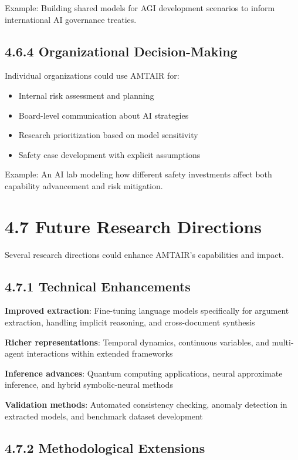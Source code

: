 \documentclass[
  11pt,
  letterpaper,
]{book}
\providecommand{\tightlist}{%
  \setlength{\itemsep}{0pt}\setlength{\parskip}{0pt}}
\begin{document}
Example: Building shared models for AGI development scenarios to inform
international AI governance treaties.

\subsection{4.6.4 Organizational
Decision-Making}\label{sec-organizational-integration}

Individual organizations could use AMTAIR for:

\begin{itemize}
\tightlist
\item
  Internal risk assessment and planning
\item
  Board-level communication about AI strategies
\item
  Research prioritization based on model sensitivity
\item
  Safety case development with explicit assumptions
\end{itemize}

Example: An AI lab modeling how different safety investments affect both
capability advancement and risk mitigation.

\section{4.7 Future Research Directions}\label{sec-future-research}

Several research directions could enhance AMTAIR's capabilities and
impact.

\subsection{4.7.1 Technical Enhancements}\label{sec-technical-future}

\textbf{Improved extraction}: Fine-tuning language models specifically
for argument extraction, handling implicit reasoning, and cross-document
synthesis

\textbf{Richer representations}: Temporal dynamics, continuous
variables, and multi-agent interactions within extended frameworks

\textbf{Inference advances}: Quantum computing applications, neural
approximate inference, and hybrid symbolic-neural methods

\textbf{Validation methods}: Automated consistency checking, anomaly
detection in extracted models, and benchmark dataset development

\subsection{4.7.2 Methodological
Extensions}\label{sec-methodological-future}
\end{document}
